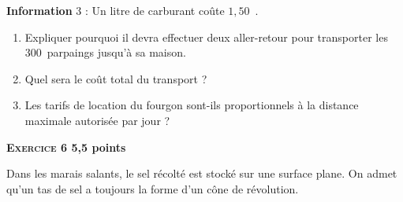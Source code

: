 \documentclass[10pt]{article}
\newcommand{\euro}{\eurologo{}}
\begin{document}
\bigskip

\textbf{Information} 3 : Un litre de carburant coûte $1,50$~\euro.
 
\medskip
 
\begin{enumerate}
\item Expliquer pourquoi il devra effectuer deux aller-retour pour transporter les $300$~parpaings jusqu'à sa maison. 
\item Quel sera le coût total du transport ? 
\item Les tarifs de location du fourgon sont-ils proportionnels à la distance maximale autorisée par jour ? 
\end{enumerate}

\bigskip

\textbf{\textsc{Exercice} 6 \hfill 5,5 points}

\medskip 

Dans les marais salants, le sel récolté est stocké sur une surface plane. On admet qu'un tas de sel a toujours la forme d'un cône de révolution. 

\medskip
\end{document}

